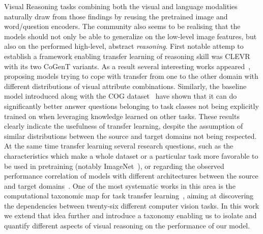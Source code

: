 Visual Reasoning tasks combining both the visual and language modalities~\cite{mogadala2019trends} naturally draw from those findings by reusing the pretrained image and word/question encoders.
The community also seems to be realising that the models should not only be able to generalize on the low-level image features, but also on the performed high-level, abstract \textit{reasoning}.
First notable attemp to establish a framework enabling transfer learning of reasoning skill was CLEVR~\cite{johnson2017clevr} with its two CoGenT variants.
As a result several interesting works appeared~\cite{mascharka2018transparency, perez2018film, johnson2017inferring,marois2018transfer}, proposing models trying to cope with transfer from one to the other domain with different distributions of visual attribute combinations.
Similarly, the baseline model introduced along with the COG dataset~\cite{yang2018dataset} have shown that it can do significantly better answer questions belonging to task classes not being explicitly trained on when leveraging knowledge learned on other tasks.
These results clearly indicate the usefulness of transfer learning, despite the assumption of similar distributions between the source and target domains not being respected.
At the same time transfer learning several research questions, such as the characteristics which make a whole dataset or a particular task more favorable to be used in pretraining (notably ImageNet~\cite{huh2016makes}), or regarding the observed performance correlation of models with different architectures between the source and target domains~\cite{kornblith2019better}.
One of the most systematic works in this area is the computational taxonomic map for task transfer learning~\cite{zamir2018taskonomy}, aiming at discovering the dependencies between twenty-six different computer vision tasks.
In this work we extend that idea further and introduce a taxonomy enabling us to isolate and quantify different aspects of visual reasoning on the performance of our model.






